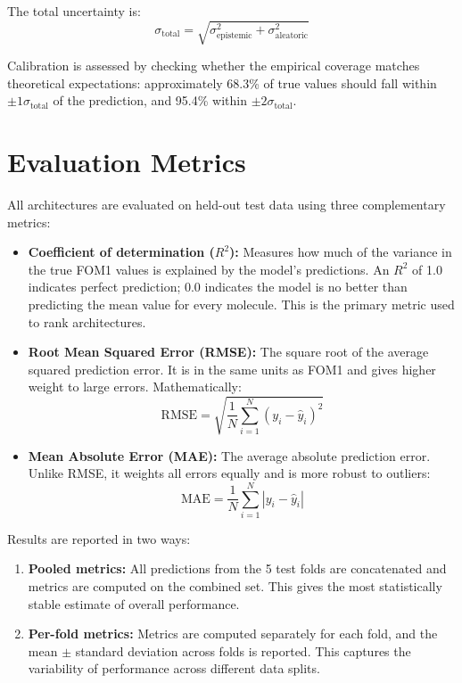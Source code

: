 \documentclass[11pt,a4paper]{article}
\begin{document}
The total uncertainty is:
\begin{equation}
    \sigma_{\text{total}} = \sqrt{\sigma^2_{\text{epistemic}} + \sigma^2_{\text{aleatoric}}}
\end{equation}

Calibration is assessed by checking whether the empirical coverage matches theoretical expectations: approximately 68.3\% of true values should fall within $\pm 1\sigma_{\text{total}}$ of the prediction, and 95.4\% within $\pm 2\sigma_{\text{total}}$.

\section{Evaluation Metrics}

All architectures are evaluated on held-out test data using three complementary metrics:

\begin{itemize}
    \item \textbf{Coefficient of determination ($R^2$):} Measures how much of the variance in the true FOM1 values is explained by the model's predictions. An $R^2$ of 1.0 indicates perfect prediction; 0.0 indicates the model is no better than predicting the mean value for every molecule. This is the primary metric used to rank architectures.

    \item \textbf{Root Mean Squared Error (RMSE):} The square root of the average squared prediction error. It is in the same units as FOM1 and gives higher weight to large errors. Mathematically:
    \begin{equation}
        \text{RMSE} = \sqrt{\frac{1}{N}\sum_{i=1}^{N}(y_i - \hat{y}_i)^2}
    \end{equation}

    \item \textbf{Mean Absolute Error (MAE):} The average absolute prediction error. Unlike RMSE, it weights all errors equally and is more robust to outliers:
    \begin{equation}
        \text{MAE} = \frac{1}{N}\sum_{i=1}^{N}|y_i - \hat{y}_i|
    \end{equation}
\end{itemize}

Results are reported in two ways:
\begin{enumerate}
    \item \textbf{Pooled metrics:} All predictions from the 5 test folds are concatenated and metrics are computed on the combined set. This gives the most statistically stable estimate of overall performance.
    \item \textbf{Per-fold metrics:} Metrics are computed separately for each fold, and the mean $\pm$ standard deviation across folds is reported. This captures the variability of performance across different data splits.
\end{enumerate}
\end{document}
